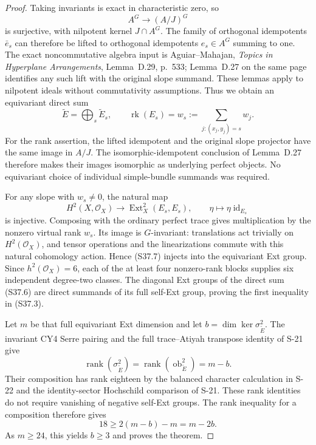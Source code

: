 \begin{proof}
Taking invariants is exact in characteristic zero, so
\[
 A^G\longrightarrow(A/J)^G
 \tag{S37.5}
\]
is surjective, with nilpotent kernel $J\cap A^G$.
The family of orthogonal idempotents $\bar e_s$ can
therefore be lifted to orthogonal idempotents
$e_s\in A^G$ summing to one. The exact noncommutative
algebra input is Aguiar--Mahajan, \emph{Topics in
Hyperplane Arrangements}, Lemma~D.29, p.~533;
Lemma~D.27 on the same page identifies any such lift
with the original slope summand. These lemmas apply
to nilpotent ideals without commutativity assumptions.
Thus we obtain an equivariant direct sum
\[
 \widetilde E=\bigoplus_s\widetilde E_s,
 \qquad
 \operatorname{rk}(E_s)=
      w_s:=\sum_{j:(x_j,y_j)=s}w_j.
 \tag{S37.6}
\]
For the rank assertion, the lifted idempotent and the
original slope projector have the same image in $A/J$.
The isomorphic-idempotent conclusion of Lemma~D.27
therefore makes their images isomorphic as underlying
perfect objects. No equivariant choice of individual
simple-bundle summands was required.

For any slope with $w_s\ne0$, the natural map
\[
 H^2(X,\mathcal O_X)\longrightarrow
       \operatorname{Ext}^2_X(E_s,E_s),
 \qquad \eta\longmapsto\eta\operatorname{id}_{E_s}
 \tag{S37.7}
\]
is injective. Composing with the ordinary perfect trace
gives multiplication by the nonzero virtual rank $w_s$.
Its image is $G$-invariant: translations act trivially
on $H^2(\mathcal O_X)$, and tensor operations and the
linearizations commute with this natural cohomology
action. Hence (S37.7) injects into the equivariant
Ext group. Since $h^2(\mathcal O_X)=6$, each of the
at least four nonzero-rank blocks supplies six
independent degree-two classes. The diagonal Ext
groups of the direct sum (S37.6) are direct summands
of its full self-Ext group, proving the first inequality
in (S37.3).

Let $m$ be that full equivariant Ext dimension and
let $b=\dim\ker\sigma^2_{\widetilde E}$.
The invariant CY4 Serre pairing and the full
trace--Atiyah transpose identity of S-21 give
\[
 \operatorname{rank}(\sigma^2_{\widetilde E})
   =\operatorname{rank}(\operatorname{ob}^2_{\widetilde E})
   =m-b.
\]
Their composition has rank eighteen by the balanced
character calculation in S-22 and the identity-sector
Hochschild comparison of S-21. These rank identities
do not require vanishing of negative self-Ext groups.
The rank inequality for a composition therefore gives
\[
 18\ge2(m-b)-m=m-2b.
 \tag{S37.8}
\]
As $m\ge24$, this yields $b\ge3$ and proves the theorem.
\end{proof}
